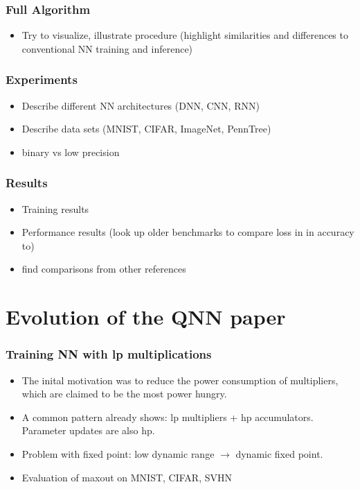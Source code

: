 \documentclass{article}
\begin{document}
\subsubsection*{Full Algorithm}
    \begin{itemize}
        \item Try to visualize, illustrate procedure (highlight similarities and
        differences to conventional NN training and inference)
    \end{itemize}

\subsubsection*{Experiments}
    \begin{itemize}
        \item Describe different NN architectures (DNN, CNN, RNN)
        \item Describe data sets (MNIST, CIFAR, ImageNet, PennTree)
        \item binary vs low precision
    \end{itemize}

\subsubsection*{Results}
    \begin{itemize}
        \item Training results
        \item Performance results (look up older benchmarks to compare loss in
        in accuracy to)
        \item find comparisons from other references
    \end{itemize}

\pagebreak

\section*{Evolution of the QNN paper}

\subsubsection*{Training NN with lp multiplications}
    \begin{itemize}
    \item The inital motivation was to reduce the power consumption of multipliers, which are claimed to be the most power hungry.
    \item A common pattern already shows: lp multipliers + hp accumulators. Parameter updates are also hp.
    \item Problem with fixed point: low dynamic range $\rightarrow$ dynamic fixed point.
    \item Evaluation of maxout on MNIST, CIFAR, SVHN
    \end{itemize}
\end{document}
